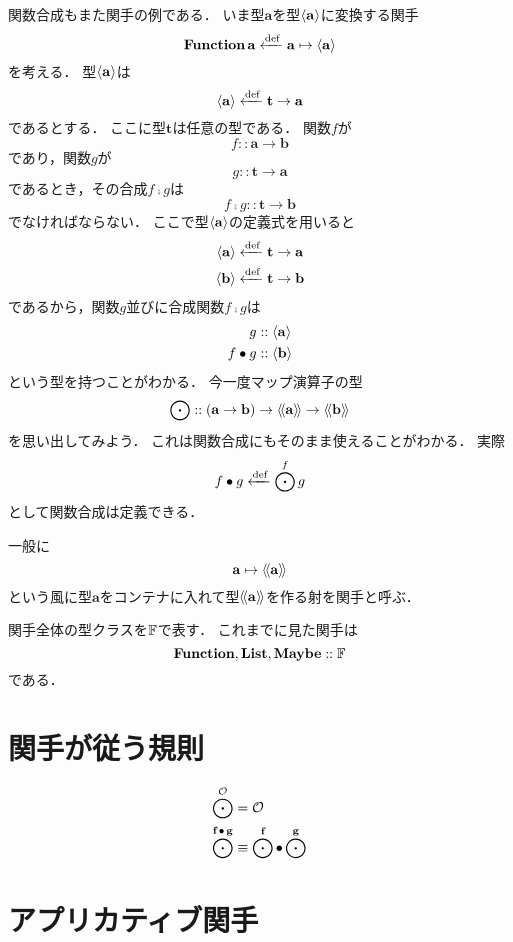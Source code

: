 \documentclass[twocolumn]{jsbook}
\newcommand{\typename}[1]{\mathbf{#1}}
\newcommand{\mathidentity}{\mathcal{O}}
\begin{document}
関数合成もまた関手の例である．
いま型$\typename{a}$を型$\function{\typename{a}}$に変換する関手$$\functionfunctor\typename{a}\defeq\typename{a}\mapsto\function{\typename{a}}$$を考える．
型$\function{\typename{a}}$は$$\function{\typename{a}}\defeq\typename{t}\rightarrow\typename{a}$$であるとする．
ここに型$\typename{t}$は任意の型である．
関数$f$が$$f::\typename{a}\rightarrow\typename{b}$$であり，関数$g$が$$g::\typename{t}\rightarrow\typename{a}$$であるとき，その合成$f\comp g$は$$f\comp g::\typename{t}\rightarrow\typename{b}$$でなければならない．
ここで型$\function{\typename{a}}$の定義式を用いると
\begin{align*}
\function{\typename{a}}&\defeq\typename{t}\rightarrow\typename{a}\\
\function{\typename{b}}&\defeq\typename{t}\rightarrow\typename{b}
\end{align*}
であるから，関数$g$並びに合成関数$f\comp g$は
\begin{align*}
g&::\function{\typename{a}}\\
f\comp g&::\function{\typename{b}}
\end{align*}
という型を持つことがわかる．
今一度マップ演算子の型$$\mapfunc::(\typename{a}\rightarrow\typename{b})\rightarrow\generalcontainer{\typename{a}}\rightarrow\generalcontainer{\typename{b}}$$を思い出してみよう．
これは関数合成にもそのまま使えることがわかる．
実際$$f\bullet g\xleftarrow{\text{def}}\bigodot^fg$$として関数合成は定義できる．

一般に$$\typename{a}\mapsto\generalcontainer{\typename{a}}$$という風に型$\typename{a}$をコンテナに入れて型$\generalcontainer{\typename{a}}$を作る射を関手と呼ぶ．

関手全体の型クラスを$\mathbb{F}$で表す．
これまでに見た関手は$$\mathop{\mathop{\textbf{Function}}},\mathop{\mathop{\textbf{List}}},\mathop{\mathop{\textbf{Maybe}}}::\mathbb{F}$$である．


\section{関手が従う規則}

\begin{align}
\mapfunc^\mathidentity&=\mathidentity\\
\mapfunc^{\functor{f}\comp\functor{g}}&\equiv\mapfunc^{\functor{f}}\comp\mapfunc^{\functor{g}}
\end{align}

\section{アプリカティブ関手}
\end{document}
